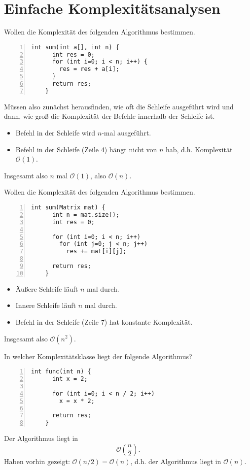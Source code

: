 \documentclass[aspectratio=169]{beamer}
\begin{document}
\section{Einfache Komplexitätsanalysen}
\begin{frame}[fragile]
  Wollen die Komplexität des folgenden Algorithmus bestimmen.
  \begin{lstlisting}[numbers=left]
    int sum(int a[], int n) {
      int res = 0;      
      for (int i=0; i < n; i++) {
        res = res + a[i];
      }
      return res;
    }
  \end{lstlisting}
  \pause
  Müssen also zunächst herausfinden, wie oft die Schleife ausgeführt wird und dann, wie groß die Komplexität der Befehle innerhalb der Schleife ist.
  \pause
  \begin{itemize}
  \item Befehl in der Schleife wird $n$-mal ausgeführt.
  \pause
  \item Befehl in der Schleife (Zeile 4) hängt nicht von $n$ hab, d.h. Komplexität $\mathcal{O}(1)$.
  \end{itemize}
  \pause
  Insgesamt also $n$ mal $\mathcal{O}(1)$, also $\mathcal{O}(n)$.
\end{frame}

\begin{frame}[fragile]
  Wollen die Komplexität des folgenden Algorithmus bestimmen.
  \begin{lstlisting}[numbers=left]
    int sum(Matrix mat) {
      int n = mat.size();
      int res = 0;
      
      for (int i=0; i < n; i++)
        for (int j=0; j < n; j++)
          res += mat[i][j];
      
      return res;
    }
  \end{lstlisting}
  \pause
  \begin{itemize}
  \item Äußere Schleife läuft $n$ mal durch.
  \pause
  \item Innere Schleife läuft $n$ mal durch.
  \pause
  \item Befehl in der Schleife (Zeile 7) hat konstante Komplexität.
  \end{itemize}
  \pause
  Insgesamt also $\mathcal{O}(n^2)$.
\end{frame}

\begin{frame}[fragile]
  In welcher Komplexitätsklasse liegt der folgende Algorithmus?
  \begin{lstlisting}[numbers=left]
    int func(int n) {
      int x = 2;
      
      for (int i=0; i < n / 2; i++)
        x = x * 2;
      
      return res;
    }
  \end{lstlisting}
  \pause
  Der Algorithmus liegt in
  \[
    \mathcal{O}(\frac{n}{2}).
  \]
  \pause
  Haben vorhin gezeigt:
  $\mathcal{O}(n/2) = \mathcal{O}(n)$, d.h. der Algorithmus liegt in $\mathcal{O}(n)$.
\end{frame}
\end{document}
